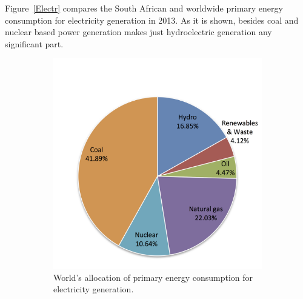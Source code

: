 Figure~\ref{Electr} compares the South African and worldwide primary energy consumption for electricity generation in 2013. As it is shown, besides coal and nuclear based power generation makes just hydroelectric generation any significant part. \cite{Agency2015}

\begin{figure}[!htbp]
        \centering                
        \begin{subfigure}[b]{0.45\textwidth}
                \centering
                \includegraphics[width=1\textwidth]{FIG/ElectrWorld}
                \caption{World's allocation of primary energy consumption for electricity generation.}\label{ElectrWorld}
        \end{subfigure}
        ~
        \begin{subfigure}[b]{0.45\textwidth}
                \centering

\end{subfigure}
\end{figure}
